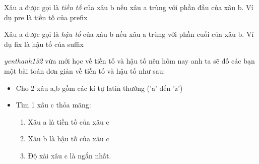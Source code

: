 Xâu a được gọi là   \emph{    tiền tố   }   của xâu b nếu xâu a trùng với phần đầu của xâu b. Ví dụ       pre      là tiền tố của       prefix   

   Xâu a được gọi là   \emph{    hậu tố   }   của xâu b nếu xâu a trùng với phần cuối của xâu b. Ví dụ       fix      là hậu tố của       suffix   

\emph{    yenthanh132   }   vừa mới học về tiền tố và hậu tố nên hôm nay anh ta sẽ đố các bạn một bài toán đơn giản về tiền tố và hậu tố như sau:  
\begin{itemize}
	\item     Cho 2 xâu a,b gồm các kí tự latin thường ('a' đến 'z')   
	\item     Tìm 1 xâu c thỏa mãng:    
\begin{enumerate}
	\item       Xâu a là tiền tố của xâu c     
	\item       Xâu b là hậu tố của xâu c     
	\item       Độ xài xâu c là ngắn nhất.     
\end{enumerate}
\end{itemize}
\begin{enumerate}
\end{enumerate}

\